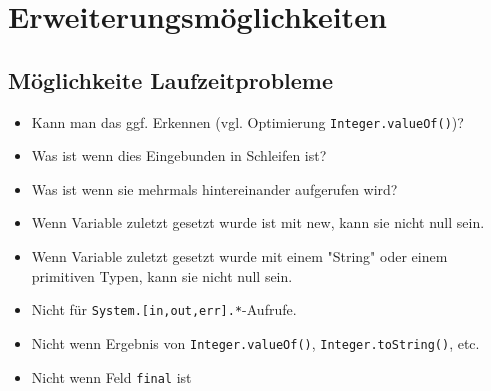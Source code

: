 
\chapter{Erweiterungsmöglichkeiten}

\section{Möglichkeite Laufzeitprobleme}


\begin{itemize}
\item Kann man das ggf. Erkennen (vgl. Optimierung \texttt{Integer.valueOf()})?
\item Was ist wenn dies Eingebunden in Schleifen ist?
\item Was ist wenn sie mehrmals hintereinander aufgerufen wird?
\item Wenn Variable zuletzt gesetzt wurde ist mit new, kann sie nicht null sein.
\item Wenn Variable zuletzt gesetzt wurde mit einem "String" oder einem primitiven Typen, kann sie nicht null sein.
\item Nicht für \texttt{System.[in,out,err].*}-Aufrufe.
\item Nicht wenn Ergebnis von \texttt{Integer.valueOf()}, \texttt{Integer.toString()}, etc.
\item Nicht wenn Feld \texttt{final} ist
\end{itemize}

